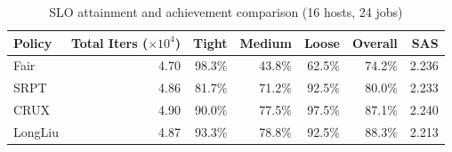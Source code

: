\begin{table}[t]
\centering
\caption{SLO attainment and achievement comparison (16 hosts, 24 jobs)}
\label{tab:slo_16host}
\begin{tabular}{l|r|r|r|r|r|r}
\hline
Policy & Total Iters ($\times 10^4$) & Tight & Medium & Loose & Overall & SAS \\
\hline
Fair & 4.70 & 98.3\% & 43.8\% & 62.5\% & 74.2\% & 2.236 \\
SRPT & 4.86 & 81.7\% & 71.2\% & 92.5\% & 80.0\% & 2.233 \\
CRUX & 4.90 & 90.0\% & 77.5\% & 97.5\% & 87.1\% & 2.240 \\
LongLiu & 4.87 & 93.3\% & 78.8\% & 92.5\% & 88.3\% & 2.213 \\
\hline
\end{tabular}
\end{table}
